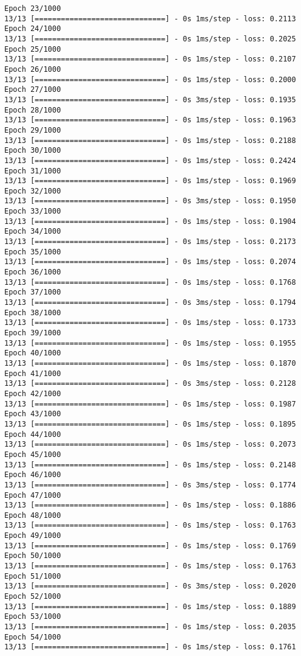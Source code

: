 \documentclass[11pt]{article}
\begin{document}
\begin{Verbatim}[commandchars=\\\{\}]
Epoch 23/1000
13/13 [==============================] - 0s 1ms/step - loss: 0.2113
Epoch 24/1000
13/13 [==============================] - 0s 1ms/step - loss: 0.2025
Epoch 25/1000
13/13 [==============================] - 0s 1ms/step - loss: 0.2107
Epoch 26/1000
13/13 [==============================] - 0s 1ms/step - loss: 0.2000
Epoch 27/1000
13/13 [==============================] - 0s 3ms/step - loss: 0.1935
Epoch 28/1000
13/13 [==============================] - 0s 1ms/step - loss: 0.1963
Epoch 29/1000
13/13 [==============================] - 0s 1ms/step - loss: 0.2188
Epoch 30/1000
13/13 [==============================] - 0s 1ms/step - loss: 0.2424
Epoch 31/1000
13/13 [==============================] - 0s 1ms/step - loss: 0.1969
Epoch 32/1000
13/13 [==============================] - 0s 3ms/step - loss: 0.1950
Epoch 33/1000
13/13 [==============================] - 0s 1ms/step - loss: 0.1904
Epoch 34/1000
13/13 [==============================] - 0s 1ms/step - loss: 0.2173
Epoch 35/1000
13/13 [==============================] - 0s 1ms/step - loss: 0.2074
Epoch 36/1000
13/13 [==============================] - 0s 1ms/step - loss: 0.1768
Epoch 37/1000
13/13 [==============================] - 0s 3ms/step - loss: 0.1794
Epoch 38/1000
13/13 [==============================] - 0s 1ms/step - loss: 0.1733
Epoch 39/1000
13/13 [==============================] - 0s 1ms/step - loss: 0.1955
Epoch 40/1000
13/13 [==============================] - 0s 1ms/step - loss: 0.1870
Epoch 41/1000
13/13 [==============================] - 0s 3ms/step - loss: 0.2128
Epoch 42/1000
13/13 [==============================] - 0s 1ms/step - loss: 0.1987
Epoch 43/1000
13/13 [==============================] - 0s 1ms/step - loss: 0.1895
Epoch 44/1000
13/13 [==============================] - 0s 1ms/step - loss: 0.2073
Epoch 45/1000
13/13 [==============================] - 0s 1ms/step - loss: 0.2148
Epoch 46/1000
13/13 [==============================] - 0s 3ms/step - loss: 0.1774
Epoch 47/1000
13/13 [==============================] - 0s 1ms/step - loss: 0.1886
Epoch 48/1000
13/13 [==============================] - 0s 1ms/step - loss: 0.1763
Epoch 49/1000
13/13 [==============================] - 0s 1ms/step - loss: 0.1769
Epoch 50/1000
13/13 [==============================] - 0s 1ms/step - loss: 0.1763
Epoch 51/1000
13/13 [==============================] - 0s 3ms/step - loss: 0.2020
Epoch 52/1000
13/13 [==============================] - 0s 1ms/step - loss: 0.1889
Epoch 53/1000
13/13 [==============================] - 0s 1ms/step - loss: 0.2035
Epoch 54/1000
13/13 [==============================] - 0s 1ms/step - loss: 0.1761

\end{Verbatim}
\end{document}
